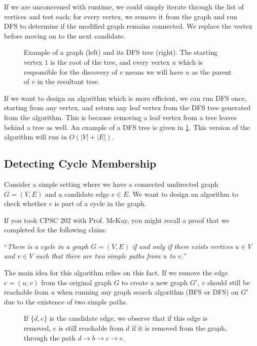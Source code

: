 \documentclass[11pt]{article}
\begin{document}
If we are unconcerned with runtime, we could simply iterate through the list of vertices and test each; for every vertex, we remove it from the graph and run DFS to determine if the modified graph remains connected. We replace the vertex before moving on to the next candidate. 

\begin{figure}[H]
    \begin{center}
        
    \end{center}
    \caption{Example of a graph (left) and its DFS tree (right). The starting vertex $1$ is the root of the tree, and every vertex $u$ which is responsible for the discovery of $v$ means we will have $u$ as the parent of $v$ in the resultant tree.}
    \label{DFSTree}
\end{figure}

If we want to design an algorithm which is more efficient, we can run DFS once, starting from any vertex, and return any leaf vertex from the DFS tree generated from the algorithm. This is because removing a leaf vertex from a tree leaves behind a tree as well. An example of a DFS tree is given in \cref{DFSTree}. This version of the algorithm will run in $O(|V| + |E|)$. 

\newpage
\subsection{Detecting Cycle Membership}
Consider a simple setting where we have a connected undirected graph $G = (V, E)$ and a candidate edge $e \in E$. We want to design an algorithm to check whether $e$ is part of a cycle in the graph. 

If you took CPSC 202 with Prof. McKay, you might recall a proof that we completed for the following claim:

``\emph{There is a cycle in a graph $G = (V, E)$ if and only if there exists vertices $u \in V$ and $v \in V$ such that there are two simple paths from $u$ to $v$.}''

The main idea for this algorithm relies on this fact. If we remove the edge $e = (u, v)$ from the original graph $G$ to create a new graph $G'$, $v$ should still be reachable from $u$ when running any graph search algorithm (BFS or DFS) on $G'$ due to the existence of two simple paths. 

\begin{figure}[H]
    \begin{center}
        
    \end{center}
    \caption{If $\{d, e \}$ is the candidate edge, we observe that if this edge is removed, $e$ is still reachable from $d$ if it is removed from the graph, through the path $d \to b \to c \to e$.}
\end{figure}
\end{document}
